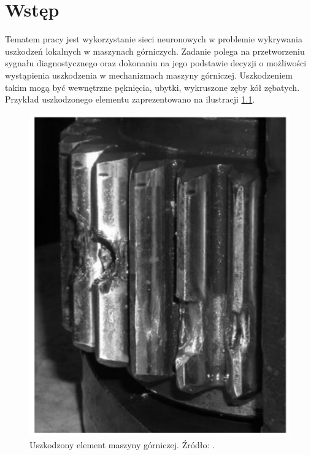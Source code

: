 \documentclass[inzynierska]{pwr_wmat_praca_dyplomowa}
\theoremstyle{plain}
\numberwithin{theorem}{chapter}
\theoremstyle{definition}
\numberwithin{theorem}{chapter}
\begin{document}
\frontmatter
\maketitle
\mainmatter
\tableofcontents



{\backmatter \chapter{Wstęp}}
\label{chap:wstep}

Tematem pracy jest wykorzystanie sieci neuronowych w problemie wykrywania uszkodzeń lokalnych w maszynach górniczych. Zadanie polega na przetworzeniu sygnału diagnostycznego oraz dokonaniu na jego podstawie decyzji o możliwości wystąpienia uszkodzenia w mechanizmach maszyny górniczej. Uszkodzeniem takim mogą być wewnętrzne pęknięcia, ubytki, wykruszone zęby kół zębatych. Przykład uszkodzonego elementu zaprezentowano na ilustracji \ref{uszkodzenie}.
\begin{figure}[ht]
	
	\centering
	
	\includegraphics[scale=0.5]{images/uszkodzenie_kolko.png}
	\caption{Uszkodzony element maszyny górniczej. Źródło: \cite{bartelmus1991diagnostyka}.}
	\label{uszkodzenie}
\end{figure}
\end{document}
